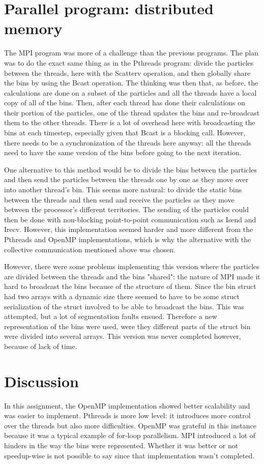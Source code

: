 \documentclass{article}
\begin{document}
\section{Parallel program: distributed memory}

The MPI program was more of a challenge than the previous programs. The plan was to do the exact same thing as in the Pthreads program: divide the particles between the threads, here with the Scatterv operation, and then globally share the bins by using the Bcast operation. The thinking was then that, as before, the calculations are done on a subset of the particles and all the threads have a local copy of all of the bins. Then, after each thread has done their calculations on their portion of the particles, one of the thread updates the bins and re-broadcast them to the other threads. There is a lot of overhead here with broadcasting the bins at each timestep, especially given that Bcast is a blocking call. However, there needs to be a synchronization of the threads here anyway: all the threads need to have the same version of the bins before going to the next iteration. 

One alternative to this method would be to divide the bins between the particles and then send the particles between the threads one by one as they move over into another thread's bin. This seems more natural: to divide the static bins between the threads and then send and receive the particles as they move between the processor's different territories. The sending of the particles could then be done with non-blocking point-to-point communication such as Isend and Irecv. However, this implementation seemed harder and more different from the Pthreads and OpenMP implementations, which is why the alternative with the collective communication mentioned above was chosen.  

However, there were some problems implementing this version where the particles are divided between the threads and the bins "shared": the nature of MPI made it hard to broadcast the bins because of the structure of them. Since the bin struct had two arrays with a dynamic size there seemed to have to be some struct serialization of the struct involved to be able to broadcast the bins. This was attempted, but a lot of segmentation faults ensued. Therefore a new representation of the bins were used, were they different parts of the struct bin were divided into several arrays. This version was never completed however, because of lack of time.


\section{Discussion}

In this assignment, the OpenMP implementation showed better scalability and was easier to implement. Pthreads is more low level: it introduces more control over the threads but also more difficulties. OpenMP was grateful in this instance because it was a typical example of for-loop parallelism. MPI introduced a lot of hinders in the way the bins were represented. Whether it was better or not speedup-wise is not possible to say since that implementation wasn't completed. 
\end{document}

